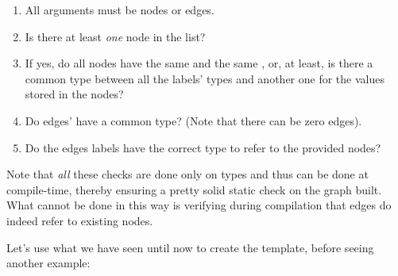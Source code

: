 \begin{enumerate}
\item All arguments must be nodes or edges.
\item Is there at least \emph{one} node in the list?
\item If yes, do all nodes have the same  and the same , or, at least, is there a common type between all the labels' types and another one for the values stored in the nodes?
\item Do edges'  have a common type? (Note that there can be zero edges).
\item Do the edges labels have the correct type to refer to the provided nodes?
\end{enumerate}

Note that \emph{all} these checks are done only on types and thus can be done at compile-time, thereby ensuring a pretty solid static check on the graph built. What cannot be done in this way is verifying during compilation that edges do indeed refer to existing nodes.

Let's use what we have seen until now to create the \label{graphcheck} template, before seeing another  example:


